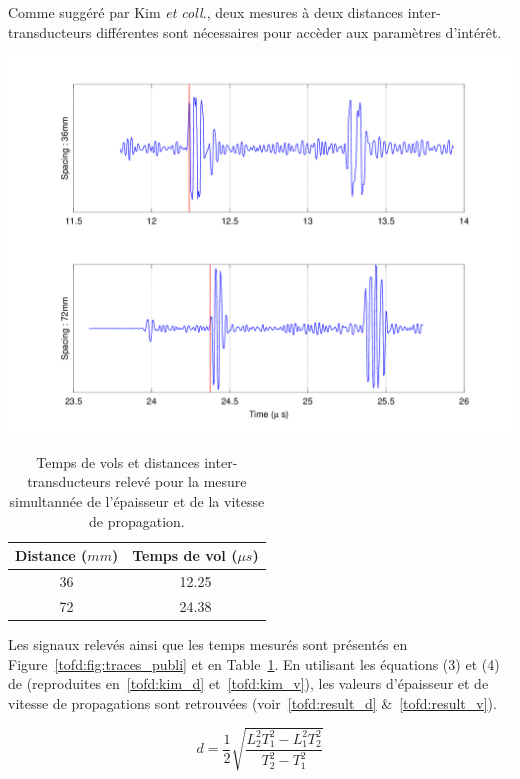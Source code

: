 Comme suggéré par Kim \textit{et coll.}\autocite{kim_simultaneous_2003}, deux mesures à
deux distances inter-transducteurs différentes sont nécessaires pour accèder aux paramètres d'intérêt.

\begin{figurehere}
	\centering
	\includegraphics[width=0.8\linewidth]{tofd_figs/time_records_publi.png}
	\caption{Traces des deux signaux mesurés (attention, les abscisses ne concordent pas) pour
	la détermination simultanée de l'épaisseur et de la vitesse de propagation.}
	\label{tofd:fig:traces_publi}
\end{figurehere}

\begin{table}
	\centering
	\caption{Temps de vols et distances inter-transducteurs relevé pour la mesure
	simultannée de l'épaisseur et de la vitesse de propagation.}
	\label{tofd:tab:publi}
	\begin{tabular}{c|c}
		Distance ($mm$) & Temps de vol ($\mu s$)\\\hline
		36 & 12.25\\
		72 & 24.38\\
	\end{tabular}
\end{table}

Les signaux relevés ainsi que les temps mesurés sont présentés en
Figure~\ref{tofd:fig:traces_publi} et en Table~\ref{tofd:tab:publi}. En utilisant les
équations (3) et (4) de \cite{kim_simultaneous_2003} (reproduites en~\eqref{tofd:kim_d}
et~\eqref{tofd:kim_v}), les valeurs d'épaisseur et de vitesse de propagations sont
retrouvées (voir~\eqref{tofd:result_d} \&~\eqref{tofd:result_v}).

\begin{equation}
	d = \frac{1}{2}\sqrt{\frac{L_2^2T_1^2 - L_1^2T_2^2}{T_2^2 - T_1^2}} \label{tofd:kim_d}
\end{equation}

